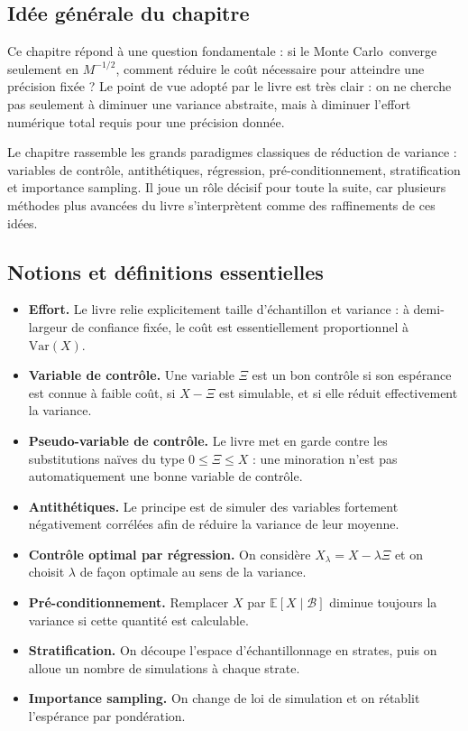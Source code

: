 \documentclass[11pt,a4paper]{article}
\newcommand{\E}{\mathbb{E}}
\newcommand{\mc}{Monte Carlo}
\begin{document}
\subsection{Idée générale du chapitre}

Ce chapitre répond à une question fondamentale : si le \mc\ converge seulement en $M^{-1/2}$, comment réduire le coût nécessaire pour atteindre une précision fixée ? Le point de vue adopté par le livre est très clair : on ne cherche pas seulement à diminuer une variance abstraite, mais à diminuer l'effort numérique total requis pour une précision donnée.

Le chapitre rassemble les grands paradigmes classiques de réduction de variance : variables de contrôle, antithétiques, régression, pré-conditionnement, stratification et importance sampling. Il joue un rôle décisif pour toute la suite, car plusieurs méthodes plus avancées du livre s'interprètent comme des raffinements de ces idées.

\subsection{Notions et définitions essentielles}

\begin{itemize}
  \item \textbf{Effort.} Le livre relie explicitement taille d'échantillon et variance : à demi-largeur de confiance fixée, le coût est essentiellement proportionnel à $\mathrm{Var}(X)$.
  \item \textbf{Variable de contrôle.} Une variable $\Xi$ est un bon contrôle si son espérance est connue à faible coût, si $X-\Xi$ est simulable, et si elle réduit effectivement la variance.
  \item \textbf{Pseudo-variable de contrôle.} Le livre met en garde contre les substitutions naïves du type $0\le \Xi\le X$ : une minoration n'est pas automatiquement une bonne variable de contrôle.
  \item \textbf{Antithétiques.} Le principe est de simuler des variables fortement négativement corrélées afin de réduire la variance de leur moyenne.
  \item \textbf{Contrôle optimal par régression.} On considère $X_\lambda=X-\lambda\Xi$ et on choisit $\lambda$ de façon optimale au sens de la variance.
  \item \textbf{Pré-conditionnement.} Remplacer $X$ par $\E[X\mid\mathcal B]$ diminue toujours la variance si cette quantité est calculable.
  \item \textbf{Stratification.} On découpe l'espace d'échantillonnage en strates, puis on alloue un nombre de simulations à chaque strate.
  \item \textbf{Importance sampling.} On change de loi de simulation et on rétablit l'espérance par pondération.
\end{itemize}
\end{document}
